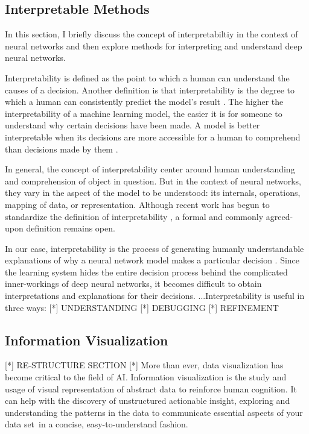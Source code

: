 \subsection{Interpretable Methods}

In this section, I briefly discuss the concept of interpretabiltiy in the context of neural networks and then explore methods for interpreting and understand deep neural networks.

Interpretability is defined as the point to which a human can understand the causes of a decision. Another definition is that interpretability is the degree to which a human can consistently predict the model’s result \cite{molnar}. The higher the interpretability of a machine learning model, the easier it is for someone to understand why certain decisions have been made. A model is better interpretable when its decisions are more accessible for a human to comprehend than decisions made by them \cite{molnar}.

In general, the concept of interpretability center around human understanding and comprehension of object in question. But in the context of neural networks, they vary in the aspect of the model to be understood: its internals, operations, mapping of data, or representation. Although recent work has begun to standardize the definition of interpretability \cite{Lipton2018}, a formal and commonly agreed-upon definition remains open.
    
In our case, interpretability is the process of generating humanly understandable explanations of why a neural network model makes a particular decision \cite{Sacha2017}. Since the learning system hides the entire decision process behind the complicated inner-workings of deep neural networks, it becomes difficult to obtain interpretations and explanations for their decisions.
...Interpretability  is useful in three ways:
[*] UNDERSTANDING
[*] DEBUGGING
[*] REFINEMENT

\subsection{Information Visualization}
[*] RE-STRUCTURE SECTION
[*] More than ever, data visualization has become critical to the field of AI.
Information visualization is the study and usage of visual representation of abstract data to reinforce human cognition. It can help with the discovery of unstructured actionable insight, exploring and understanding the patterns in the data to communicate essential aspects of your data set in a concise, easy-to-understand fashion.

